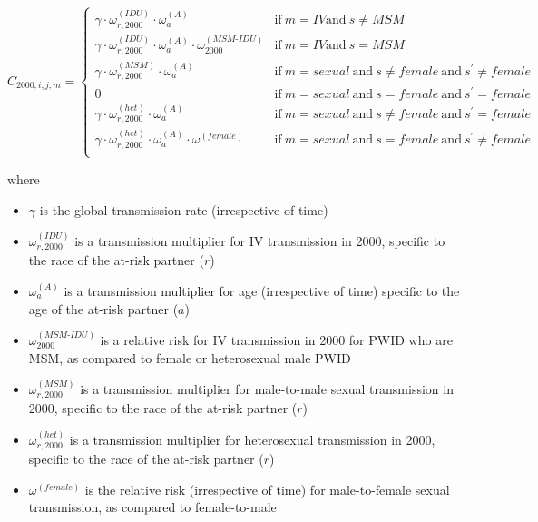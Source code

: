 \documentclass{article}
\begin{document}
\begin{equation}
C_{2000,i,j,m} = \begin{cases}
\gamma \cdot \omega^{(IDU)}_{r,2000} \cdot \omega^{(A)}_a & \text{if}\ m=IV \text{and}\ s\neq MSM \\
\gamma \cdot \omega^{(IDU)}_{r,2000} \cdot \omega^{(A)}_a \cdot \omega^{(MSM\text{-}IDU)}_{2000} & \text{if}\ m=IV \text{and}\ s=MSM\\
\gamma \cdot \omega^{(MSM)}_{r,2000} \cdot \omega^{(A)}_a & \text{if}\ m=sexual\ \text{and}\ s\neq female\ \text{and}\ s^\prime\neq female\\
0 & \text{if}\ m=sexual\ \text{and}\ s=female\ \text{and}\ s^\prime=female\\
\gamma \cdot \omega^{(het)}_{r,2000} \cdot \omega^{(A)}_a & \text{if}\ m=sexual\ \text{and}\ s\neq female\ \text{and}\ s^\prime= female\\
\gamma \cdot \omega^{(het)}_{r,2000} \cdot \omega^{(A)}_a \cdot \omega^{(female)} & \text{if}\ m=sexual\ \text{and}\ s= female\ \text{and}\ s^\prime\neq female\\
\end{cases}
\end{equation}

where
\begin{itemize}
	\item $\gamma$ is the global transmission rate (irrespective of time)
	\item $\omega^{(IDU)}_{r,2000}$ is a transmission multiplier for IV transmission in 2000, specific to the race of the at-risk partner ($r$)
	\item $\omega^{(A)}_a$ is a transmission multiplier for age (irrespective of time) specific to the age of the at-risk partner ($a$)
	\item $\omega^{(MSM\text{-}IDU)}_{2000}$ is a relative risk for IV transmission in 2000 for PWID who are MSM, as compared to female or heterosexual male PWID
	\item $\omega^{(MSM)}_{r,2000}$ is a transmission multiplier for male-to-male sexual transmission in 2000, specific to the race of the at-risk partner ($r$)
	\item $\omega^{(het)}_{r,2000}$ is a transmission multiplier for heterosexual transmission in 2000, specific to the race of the at-risk partner ($r$)
	\item $\omega^{(female)}$ is the relative risk (irrespective of time) for male-to-female sexual transmission, as compared to female-to-male
\end{itemize}
\end{document}
